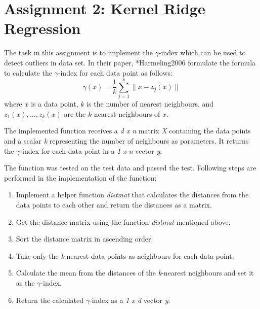 \section{Assignment 2: Kernel Ridge Regression}
\label{sec:assignment2}

The task in this assignment is to implement the $\gamma$-index which can be used to detect outliers in data set. In their paper, \citeasnoun**{Harmeling2006} formulate the formula to calculate the $\gamma$-index for each data point as follows:
\begin{equation}
	\gamma(x)=\frac{1}{k} \sum_{j=1}^{k} \| x-z_j(x) \|
\end{equation}
where $x$ is a data point, $k$ is the number of nearest neighbours, and $z_1(x),...,z_k(x)$ are the $k$ nearest neighbours of $x$.

The implemented function receives a \textit{d x n} matrix \textit{X} containing the data points and a scalar \textit{k} representing the number of neighbours as parameters. It returns the $\gamma$-index for each data point in a \textit{1 x n} vector \textit{y}.

The function was tested on the test data and passed the test. Following steps are performed in the implementation of the function:
\begin{enumerate}
	\item Implement a helper function \textit{distmat} that calculates the distances from the data points to each other and return the distances as a matrix.
	\item Get the distance matrix using the function \textit{distmat} mentioned above.
	\item Sort the distance matrix in ascending order.
	\item Take only the \textit{k}-nearest data points as neighbours for each data point.
	\item Calculate the mean from the distances of the \textit{k}-nearest neighbours and set it as the $\gamma$-index.
	\item Return the calculated $\gamma$-index as a \textit{1 x d} vector \textit{y}.
	
\end{enumerate}
